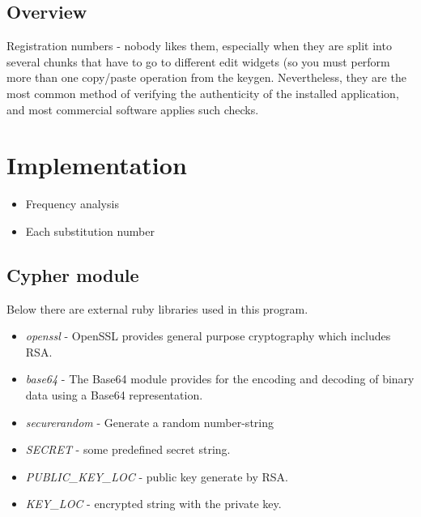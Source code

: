 \documentclass{article}
\begin{document}
  \subsection{Overview}

  Registration numbers - nobody likes them, especially when they are split into several chunks that have to 
  go to different edit widgets (so you must perform more than one copy/paste operation from the keygen.
  Nevertheless, they are the most common method of verifying the authenticity of the installed application, 
  and most commercial software applies such checks.


  \section{Implementation}

  \begin{itemize}
      \item Frequency analysis
      \item Each substitution number
  \end{itemize}

  \subsection{Cypher module}

  Below there are external ruby libraries used in this program.

  \begin{itemize}
    \item \textit{openssl} - OpenSSL provides general purpose cryptography which includes RSA.
    \item \textit{base64} - The Base64 module provides for the encoding and decoding of binary data using a Base64 representation.
    \item \textit{securerandom} - Generate a random number-string 
  \end{itemize}

  \begin{itemize}
    \item \textit{SECRET} - some predefined secret string.
    \item \textit{PUBLIC\_KEY\_LOC} - public key generate by RSA.
    \item \textit{KEY\_LOC} - encrypted string with the private key.
  \end{itemize}
\end{document}
